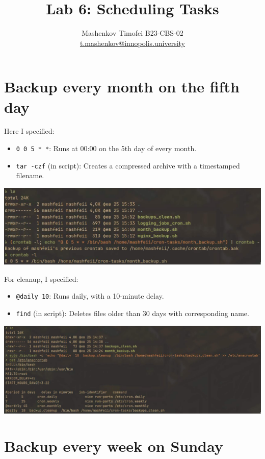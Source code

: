 \documentclass{article}
\title{Lab 6: Scheduling Tasks}
\author{Mashenkov Timofei B23-CBS-02 \\ \href{mailto:t.mashenkov@innopolis.university}{t.mashenkov@innopolis.university}}
\newcommand{\code}[1]{\colorbox{light-gray}{\texttt{#1}}}
\begin{document}
\maketitle{}

\section{Backup every month on the fifth day}
\noindent

Here I specified:
\begin{itemize}
	\item \code{0 0 5 * *}: Runs at 00:00 on the 5th day of every month.
	\item \code{tar -czf} (in script): Creates a compressed archive with a timestamped filename.
\end{itemize}

\includegraphics[width=460pt]{6_1.jpg}
\newline

For cleanup, I specified:
\begin{itemize}
	\item \code{@daily 10}: Runs daily, with a 10-minute delay.
	\item \code{find} (in script): Deletes files older than 30 days with corresponding name.
\end{itemize}

\includegraphics[width=460pt]{6_2.jpg}
\newpage

\section{Backup every week on Sunday}
\noindent
\end{document}
